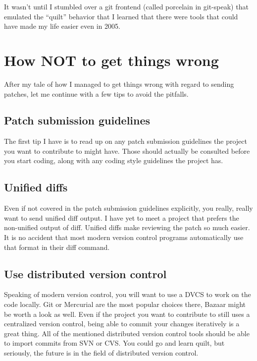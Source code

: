 It wasn't until I stumbled over a git frontend (called porcelain in git-speak)
that emulated the ``quilt'' behavior that I learned that there were tools that
could have made my life easier even in 2005.

\section*{How NOT to get things wrong}

After my tale of how I managed to get things wrong with regard to sending
patches, let me continue with a few tips to avoid the pitfalls.

\subsection*{Patch submission guidelines}

The first tip I have is to read up on any patch submission guidelines the
project you want to contribute to might have. Those should actually be consulted
before you start coding, along with any coding style guidelines the project has.

\subsection*{Unified diffs}

Even if not covered in the patch submission guidelines explicitly, you really,
really want to send unified diff output. I have yet to meet a project that
prefers the non-unified output of diff. Unified diffs make reviewing the patch
so much easier. It is no accident that most modern version control programs
automatically use that format in their diff command.

\subsection*{Use distributed version control}

Speaking of modern version control, you will want to use a DVCS to work on the
code locally. Git or Mercurial are the most popular choices there, Bazaar might
be worth a look as well. Even if the project you want to contribute to still
uses a centralized version control, being able to commit your changes
iteratively is a great thing. All of the mentioned distributed version control
tools should be able to import commits from SVN or CVS. You could go and learn
quilt, but seriously, the future is in the field of distributed version
control.

